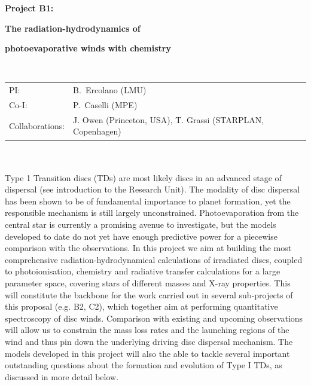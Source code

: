 \documentclass[10pt,fleqn,twoside]{article}
\begin{document}
\newpage


\setcounter{page}{1}

\centerline{\huge\bf\Tcol
%
%
%
%
%
 Project B1:}
\vspace{1em}

\centerline{\LARGE\bf\Tcol The radiation-hydrodynamics of}\vspace{0.3em}
\centerline{\LARGE\bf\Tcol photoevaporative winds with chemistry}

%
%
%
%
%
\vskip1.0cm

\\
\begin{tabular}{ll}
{\textsf{PI:}}                  & B.~Ercolano (LMU)\\
{\textsf{Co-I:}}                &P.~Caselli (MPE)\\
{\textsf{Collaborations:}}      & J. Owen (Princeton, USA), T. Grassi (STARPLAN, Copenhagen)  \
\end{tabular}


\vspace{1em}
 \\

\vspace{1em}
\\
Type 1 Transition discs (TDs) are most likely discs in an advanced stage of dispersal
(see introduction to the Research Unit). The
modality of disc dispersal has been shown to be of fundamental importance to planet
formation, yet the responsible mechanism is still largely
unconstrained. Photoevaporation from the central star is currently a
promising avenue to investigate, but the models developed to date do
not yet have enough predictive power for a piecewise comparison with
the observations. In this project we aim at building the most
comprehensive radiation-hydrodynamical calculations of irradiated discs, 
coupled to photoionisation, chemistry and radiative transfer
calculations for a large parameter space, covering stars of different
masses and X-ray properties. This will constitute the backbone for the work carried
out in several sub-projects of this proposal (e.g. B2, C2), which together
aim at performing quantitative
spectroscopy of disc winds. Comparison with existing and upcoming
observations will allow us to constrain the mass loss rates and the
launching regions of the wind and thus pin down the underlying driving disc
dispersal mechanism. 
The models developed in this project will also the able to tackle
several important outstanding questions about the formation and evolution of
Type I TDs, as discussed in more detail below. 
\end{document}
